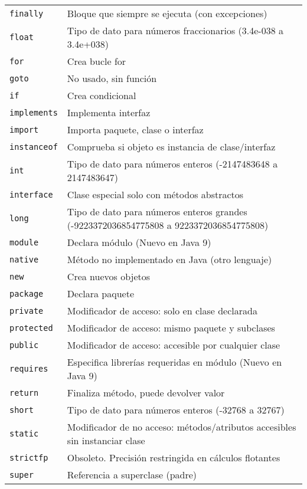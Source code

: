 \documentclass[12pt]{article}
\theoremstyle{largebreak}
\begin{document}
\begin{longtable}{l p{}}
    \lstinline|finally| & Bloque que siempre se ejecuta (con excepciones) \\
    \lstinline|float| & Tipo de dato para números fraccionarios (3.4e-038 a 3.4e+038) \\
    \lstinline|for| & Crea bucle for \\
    \lstinline|goto| & No usado, sin función \\
    \lstinline|if| & Crea condicional \\
    \lstinline|implements| & Implementa interfaz \\
    \lstinline|import| & Importa paquete, clase o interfaz \\
    \lstinline|instanceof| & Comprueba si objeto es instancia de clase/interfaz \\
    \lstinline|int| & Tipo de dato para números enteros (-2147483648 a 2147483647) \\
    \lstinline|interface| & Clase especial solo con métodos abstractos \\
    \lstinline|long| & Tipo de dato para números enteros grandes (-9223372036854775808 a 9223372036854775808) \\
    \lstinline|module| & Declara módulo (Nuevo en Java 9) \\
    \lstinline|native| & Método no implementado en Java (otro lenguaje) \\
    \lstinline|new| & Crea nuevos objetos \\
    \lstinline|package| & Declara paquete \\
    \lstinline|private| & Modificador de acceso: solo en clase declarada \\
    \lstinline|protected| & Modificador de acceso: mismo paquete y subclases \\
    \lstinline|public| & Modificador de acceso: accesible por cualquier clase \\
    \lstinline|requires| & Especifica librerías requeridas en módulo (Nuevo en Java 9) \\
    \lstinline|return| & Finaliza método, puede devolver valor \\
    \lstinline|short| & Tipo de dato para números enteros (-32768 a 32767) \\
    \lstinline|static| & Modificador de no acceso: métodos/atributos accesibles sin instanciar clase \\
    \lstinline|strictfp| & Obsoleto. Precisión restringida en cálculos flotantes \\
    \lstinline|super| & Referencia a superclase (padre) \\

\end{longtable}
\end{document}
